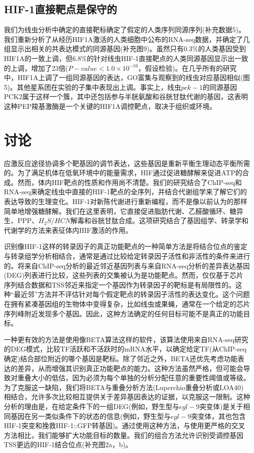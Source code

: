 \documentclass{ctexart}
\begin{document}
    \subsection{HIF-1直接靶点是保守的}

        我们为线虫分析中确定的直接靶标确定了假定的人类序列同源序列(补充数据5)。我们重新分析了从经历HIF1A激活的人类细胞中公布的RNA-seq数据，并确定了几组显示出相关的共表达模式的同源基因(补充图9)。虽然只有0.3\%的人类基因受到HIF1A的一致上调，但6.8\%的针对线虫HIF-1直接靶点的人类同源基因显示出一致的上调，增加了23倍($P-value < 1.0 \times 10^{-16}$，假设检验)。在几乎所有的研究中，HIF1A上调了一组同源基因的表达，GO富集与观察到的线虫对应基因相似(图5)。其他星系团在实验的子集中表现出上调。事实上，线虫$pck-1$的同源基因PCK2属于这样一个簇，其中还包括参与半胱氨酸和谷胱甘肽代谢的基因，这表明这种PEP羧基激酶是一个关键的HIF1A调控靶点，取决于组织或环境。

    \section{讨论}

        应激反应途径协调多个靶基因的调节表达，这些基因是重新平衡生理动态平衡所需的。为了满足机体在低氧环境中的能量需求，HIF通过促进糖酵解来促进ATP的合成。然而，体内HIF靶点的性质和作用尚不清楚。我们的研究结合了ChIP-seq和RNA-seq来确定线虫中直接的HIF-1靶点的全序列，并结合代谢组学来了解它们的表达导致的生理变化。HIF-1对新陈代谢进行重新编程，而不是像以前认为的那样简单地增强糖酵解。我们在这里表明，它直接促进脂肪代谢、乙醛酸循环、糖异生、PPP、$H_{2}S/HCN$解毒和谷胱甘肽合成。这项研究结合了基因组学、转录学和代谢学的方法来表征体内HIF激活的作用。

        识别像HIF-1这样的转录因子的真正功能靶点的一种简单方法是将结合位点的鉴定与转录组学分析相结合，通常是通过比较给定转录因子活性和非活性的条件来进行的。将来自ChIP-seq分析的最近邻近基因列表与来自RNA-seq分析的差异表达基因(DEG)列表进行比较，这些列表的交集被认为是功能靶点。然而，仅仅基于芯片序列结合数据和TSS邻近来指定一个基因作为转录因子的靶标是有局限性的。这种“最近邻”方法并不评估针对每个假定靶点的转录因子活性的表达变化。这个问题在拥有紧凑基因组的生物体中变得复杂，比如线虫或果蝇，通常在一个给定的芯片序列峰附近发现多个基因。因此，这种方法确定的任何目标可能不是真正的功能目标。

        一种更有效的方法是使用像BETA算法这样的软件，该算法使用来自RNA-seq研究的DEG模式，比较TF活跃和不活跃时的mRNA水平，以确定给定TF(从ChIP-seq确定)结合部位附近的哪个基因是靶标。除了邻近之外，BETA还优先考虑功能表达的差异，从而增强其识别真正功能靶点的能力。这种方法虽然严格，但可能会导致对重叠大小的低估，因为必须为每个单独的分析分配任意的重要性阈值或等级。为了克服这一缺陷，我们将BETA与重叠分析方法(Luperchio重叠分析或LOA40)相结合，允许多次比较相互提供关于差异基因表达的证据，以克服这一限制。这种分析的理由是，在给定条件下的一组DEG(例如，野生型与$egl-9$突变体)是关于相同基因在另一类似条件下的状态的信息(例如，野生型与$egl-9$突变体，其也包含HIF-1突变和挽救HIF-1::GFP转基因)。通过使用这种方法，与使用更严格的交叉方法相比，我们能够扩大功能目标的数量。我们的组合方法允许识别受调控基因TSS更远的HIF-1结合位点(补充图2a，b)。
        
\end{document}
